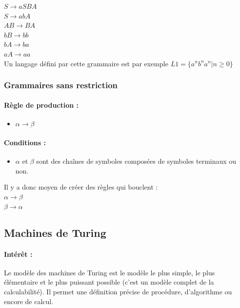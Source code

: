 \begin{myexem}
	$S \rightarrow aSBA$ \\
	$S \rightarrow abA$ \\
	$AB \rightarrow BA$ \\
	$bB \rightarrow bb$ \\
	$bA \rightarrow ba$ \\
	$aA \rightarrow aa$ \\
	Un langage défini par cette grammaire est par exemple $L1 =
	\{a^nb^na^n|n \geq 0\}$
\end{myexem}

\subsubsection{Grammaires sans restriction}

\paragraph{Règle de production :} 
\begin{itemize}
	\item $\alpha \rightarrow \beta$
\end{itemize}

\paragraph{Conditions :}

\begin{itemize}
	\item $\alpha$ et $\beta$ sont des chaînes de symboles composées de 
		symboles terminaux ou non.
\end{itemize}

\begin{myexem}
	Il y a donc moyen de créer des règles qui bouclent : \\
	$\alpha \rightarrow \beta$ \\
	$\beta \rightarrow \alpha$\\
\end{myexem}

\subsection{Machines de Turing}
\paragraph{Intérêt :}Le modèle des machines de Turing est le modèle le plus 
simple, le plus élémentaire et le plus puissant possible (c'est un modèle
complet de la calculabilité). Il permet une définition précise de procédure, 
d'algorithme ou encore de calcul.

